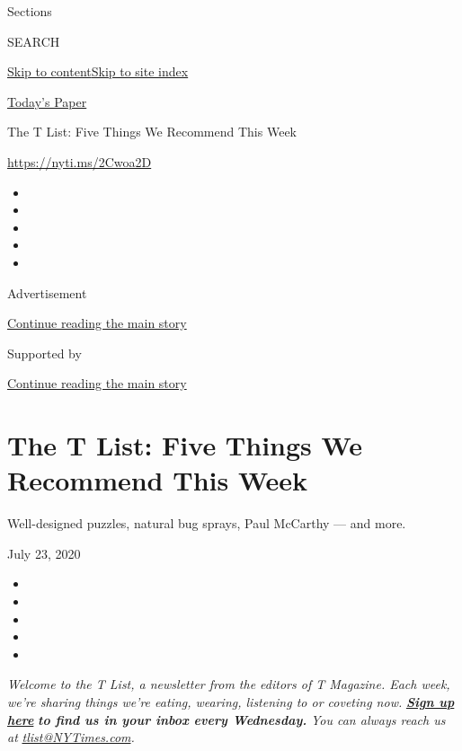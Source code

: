 Sections

SEARCH

\protect\hyperlink{site-content}{Skip to
content}\protect\hyperlink{site-index}{Skip to site index}

\href{https://myaccount.nytimes3xbfgragh.onion/auth/login?response_type=cookie\&client_id=vi}{}

\href{https://www.nytimes3xbfgragh.onion/section/todayspaper}{Today's
Paper}

The T List: Five Things We Recommend This Week

\url{https://nyti.ms/2Cwoa2D}

\begin{itemize}
\item
\item
\item
\item
\item
\end{itemize}

Advertisement

\protect\hyperlink{after-top}{Continue reading the main story}

Supported by

\protect\hyperlink{after-sponsor}{Continue reading the main story}

\hypertarget{the-t-list-five-things-we-recommend-this-week}{%
\section{The T List: Five Things We Recommend This
Week}\label{the-t-list-five-things-we-recommend-this-week}}

Well-designed puzzles, natural bug sprays, Paul McCarthy --- and more.

July 23, 2020

\begin{itemize}
\item
\item
\item
\item
\item
\end{itemize}

\emph{Welcome to the T List, a newsletter from the editors of T
Magazine. Each week, we're sharing things we're eating, wearing,
listening to or coveting now.}
\textbf{\href{https://www.nytimes3xbfgragh.onion/newsletters/t-list?module=inline}{\emph{Sign
up here}}} \emph{\textbf{to find us in your inbox every Wednesday.}}
\emph{You can always reach us at}
\href{mailto:tlist@NYTimes.com}{\emph{tlist@NYTimes.com}}\emph{.}

